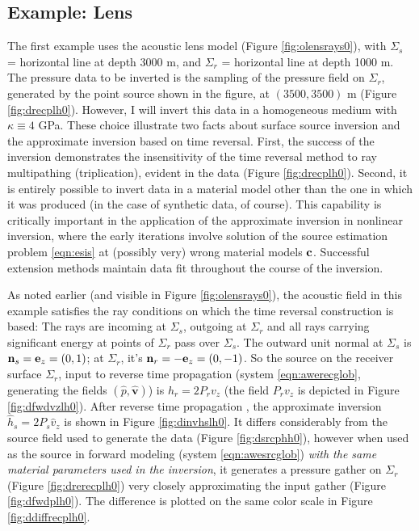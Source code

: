 \documentclass[georeport,12pt]{geophysics}
\newcommand{\bv}{\mathbf{v}}
\begin{document}
\subsection{Example: Lens}
The first example uses the acoustic lens model (Figure
\ref{fig:olensrays0}), with $\Sigma_s$ = horizontal line at depth 
3000 m, and $\Sigma_r$ = horizontal line at depth 1000 m. The pressure
data to be inverted is the sampling of the pressure field on
$\Sigma_r$, generated by the point source shown in the figure, at
$(3500, 3500)$ m (Figure \ref{fig:drecplh0}). However, I will invert
this data in a homogeneous medium with $\kappa \equiv 4$ GPa. These
choice illustrate two facts about surface source inversion and the
approximate inversion based on time reversal. First, the success of the inversion demonstrates the
insensitivity of the time reversal method to ray multipathing
(triplication), evident in the data (Figure \ref{fig:drecplh0}).
Second, it is entirely possible to invert data in a material model
other than the one in which it was produced (in the case of synthetic
data, of course). This
capability is critically important in the application of the
approximate inversion in nonlinear inversion, where the early iterations
involve solution of the source estimation problem \ref{eqn:esis} at
(possibly very) wrong material models ${\bf c}$. Successful extension
methods maintain data fit throughout the course of the inversion.

As noted earlier (and visible in Figure \ref{fig:olensrays0}), the acoustic field in this example satisfies the ray
conditions on which the time reversal construction is based: The rays
are incoming at $\Sigma_s$, outgoing at $\Sigma_r$ and all rays
carrying significant energy at points of $\Sigma_r$ pass over
$\Sigma_s$. The outward unit normal at $\Sigma_s$ is ${\bf n}_s ={\bf
  e}_z=(0,1)$; at $\Sigma_r$, it's ${\bf n}_r =-{\bf
  e}_z=(0,-1)$. So the source on the receiver surface $\Sigma_r$, input to reverse time propagation
(system \ref{eqn:awerecglob}, generating the fields $(\hat{p},\hat{\bv})$) is
$h_r=2P_rv_z$ (the field $P_rv_z$ is depicted in Figure \ref{fig:dfwdvzlh0}). After reverse time propagation , the approximate
inversion $\hat{h}_s=2P_s\hat{v}_z$ is shown in Figure
\ref{fig:dinvhslh0}. It differs considerably from the source field used to
generate the data (Figure \ref{fig:dsrcphh0}), however when used as the
source in forward modeling (system \ref{eqn:awesrcglob}) {\em with the
  same material parameters used in the inversion}, it generates a
pressure gather on $\Sigma_r$ (Figure \ref{fig:drerecplh0}) very
closely 
approximating the input gather (Figure \ref{fig:dfwdplh0}). The
difference is plotted on the same color scale in Figure
\ref{fig:ddiffrecplh0}.
\end{document}
